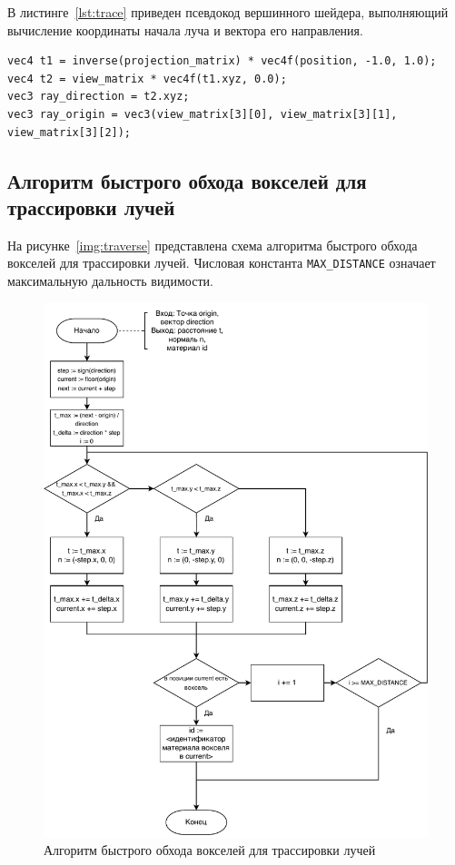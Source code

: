 В листинге~\ref{lst:trace} приведен псевдокод вершинного шейдера, выполняющий вычисление
координаты начала луча и вектора его направления.

\begin{lstlisting}[caption={Вычисление координаты начала луча и вектора его направления},label={lst:trace},frame=single]
vec4 t1 = inverse(projection_matrix) * vec4f(position, -1.0, 1.0);
vec4 t2 = view_matrix * vec4f(t1.xyz, 0.0);
vec3 ray_direction = t2.xyz;
vec3 ray_origin = vec3(view_matrix[3][0], view_matrix[3][1], view_matrix[3][2]);
\end{lstlisting}

\subsection{Алгоритм быстрого обхода вокселей для трассировки лучей}

На рисунке~\ref{img:traverse} представлена схема алгоритма быстрого 
обхода вокселей для трассировки лучей. Числовая константа \verb|MAX_DISTANCE| 
означает максимальную дальность видимости.

\begin{figure}[H]
	\centering
	\includegraphics[width=120mm]{inc/pdf/traverse}
	\caption{Алгоритм быстрого обхода вокселей для трассировки лучей}
	\label{img:rrc}
\end{figure}

